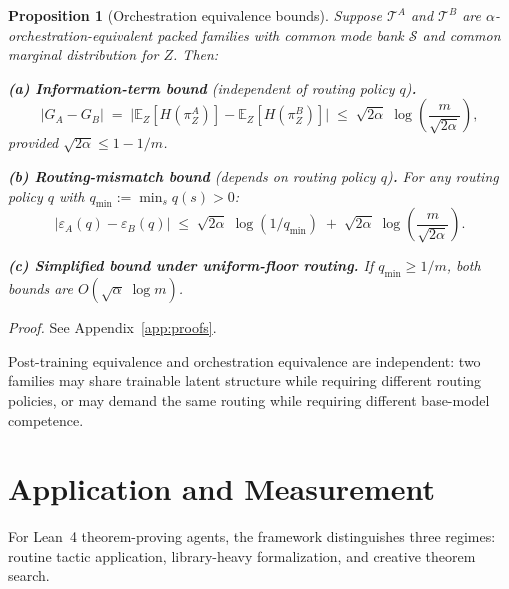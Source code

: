 \documentclass[10pt]{article}
\theoremstyle{paperplain}
\newtheorem{proposition}[theorem]{Proposition}
\theoremstyle{paperdefinition}
\theoremstyle{paperremark}
\newcommand{\E}{\mathbb{E}}
\newcommand{\cS}{\mathcal{S}}
\newcommand{\cT}{\mathcal{T}}
\begin{document}
\begin{proposition}[Orchestration equivalence bounds]
\label{prop:orch-equiv-bound}
Suppose $\cT^A$ and $\cT^B$ are $\alpha$-orchestration-equivalent packed families with common mode bank $\cS$ and common marginal distribution for $Z$.
Then:

\medskip
\noindent\textbf{(a) Information-term bound} (independent of routing policy $q$)\textbf{.}
\begin{equation}
\label{eq:orch-info-bound}
|G_A - G_B|
\;=\;
\bigl|\E_Z[H(\pi^A_Z)] - \E_Z[H(\pi^B_Z)]\bigr|
\;\le\;
\sqrt{2\alpha}\;\log\!\left(\frac{m}{\sqrt{2\alpha}}\right),
\end{equation}
provided $\sqrt{2\alpha} \le 1 - 1/m$.

\medskip
\noindent\textbf{(b) Routing-mismatch bound} (depends on routing policy $q$)\textbf{.}
For any routing policy $q$ with $q_{\min} := \min_s q(s) > 0$:
\begin{equation}
\label{eq:orch-routing-bound}
|\varepsilon_A(q) - \varepsilon_B(q)|
\;\le\;
\sqrt{2\alpha}\;\log(1/q_{\min})
\;+\;
\sqrt{2\alpha}\;\log\!\left(\frac{m}{\sqrt{2\alpha}}\right).
\end{equation}

\medskip
\noindent\textbf{(c) Simplified bound under uniform-floor routing.}
If $q_{\min} \ge 1/m$, both bounds are $O(\sqrt{\alpha}\;\log m)$.
\end{proposition}

\par\noindent\emph{Proof.} See Appendix~\ref{app:proofs}.\par

Post-training equivalence and orchestration equivalence are independent: two families may share trainable latent structure while requiring different routing policies, or may demand the same routing while requiring different base-model competence.

\section{Application and Measurement}
\label{sec:application}
\label{sec:measurement}

For Lean~4 theorem-proving agents, the framework distinguishes three regimes: routine tactic application, library-heavy formalization, and creative theorem search.
\end{document}
